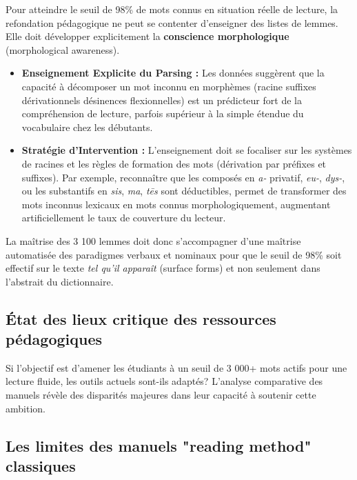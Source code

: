 {{Pour atteindre le seuil de 98\% de \og mots connus\fg{} en situation réelle de lecture, la
refondation pédagogique ne peut se contenter d'enseigner des listes de lemmes. Elle doit développer
explicitement la \textbf{conscience morphologique} (morphological awareness).\cite{III-1-2-ref5}

\begin{itemize}\item \textbf{Enseignement Explicite du Parsing :} Les données suggèrent que la capacité à décomposer un mot inconnu en morphèmes (racine \+ suffixes dérivationnels \+ désinences flexionnelles) est un prédicteur fort de la compréhension de lecture, parfois supérieur à la simple étendue du vocabulaire chez les débutants.\cite{III-1-2-ref5}\item \textbf{Stratégie d'Intervention :} L'enseignement doit se focaliser sur les \og systèmes de racines\fg{} et les règles de formation des mots (dérivation par préfixes et suffixes). Par exemple, reconnaître que les composés en \textit{a-} privatif, \textit{eu-}, \textit{dys-}, ou les substantifs en \textit{\-sis}, \textit{\-ma}, \textit{\-tēs} sont déductibles, permet de transformer des \og mots inconnus\fg{} lexicaux en \og mots connus\fg{} morphologiquement, augmentant artificiellement le taux de couverture du lecteur.\cite{III-1-2-ref34}\end{itemize}La maîtrise des 3 100 lemmes doit donc s'accompagner d'une maîtrise automatisée des paradigmes
verbaux et nominaux pour que le seuil de 98\% soit effectif sur le texte \textit{tel qu'il apparaît}
(surface forms) et non seulement dans l'abstrait du dictionnaire.



\subsection{État des lieux critique des ressources pédagogiques}

Si l'objectif est d'amener les étudiants à un seuil de 3 000+ mots actifs pour une lecture fluide,
les outils actuels sont-ils adaptés? L'analyse comparative des manuels révèle des disparités
majeures dans leur capacité à soutenir cette ambition.



\subsection{Les limites des manuels "reading method" classiques}

}}
